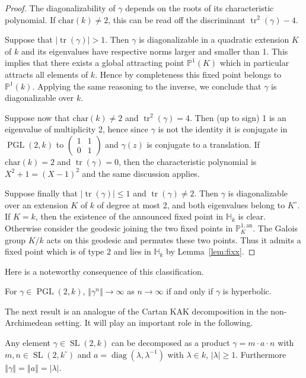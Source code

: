\documentclass[AHL,Unicode,longabstracts]{cedram}
\DeclareMathOperator{\tr}{tr}
\DeclareMathOperator{\SL}{SL}
\DeclareMathOperator{\PGL}{PGL}
\DeclareMathOperator{\diag}{diag}
\newcommand{\hh}{\mathbb{H}}
\newcommand{\an}{\mathrm{an}}
\newcommand{\cv}{\rightarrow}
\newcommand{\norm}[1]{\left\Vert#1\right\Vert}
\newcommand{\abs}[1]{\left\vert#1\right\vert}
\newcommand{\pu}{{\mathbb{P}^1}}
\newcommand{\PP}{\mathbb{P}}
\newcommand{\lrpar}[1]{\left(#1\right)}
\newcommand{\PGLk}{\PGL(2, k)}
\begin{document}
\begin{proof}
The diagonalizability of $\gamma$ depends on the roots of its characteristic polynomial.
If $\mathrm{char}(k)\neq 2$, this can be read off the discriminant $\tr^2(\gamma)-4$.

Suppose that $\mathopen|\tr(\gamma)\mathclose| >1$. Then $\gamma$ is diagonalizable in a quadratic extension $K$ of $k$ and its eigenvalues have respective norms larger and smaller than 1. This implies that there exists a global attracting point $\PP^1(K)$ which in particular attracts all elements of $k$. Hence by completeness this fixed point belongs to $\pu(k)$. Applying the same reasoning to the inverse, we conclude that $\gamma$ is diagonalizable over $k$.


Suppose now that $\mathrm{char}(k)\neq 2$ and $\tr^2(\gamma) =4$. Then (up to sign) 1 is an eigenvalue of multiplicity 2, hence since $\gamma$ is not the identity it is conjugate in $\PGLk$ to $\lrpar{
\begin{smallmatrix} 1& 1 \\ 0& 1
\end{smallmatrix}}$ and $\gamma(z)$ is conjugate to a translation.
If $\mathrm{char}(k)=2$ and $\tr(\gamma) = 0$, then the characteristic polynomial is $X^2+1 = (X-1)^2$ and the same discussion applies.

Suppose finally that $\mathopen|\tr(\gamma)\mathclose|\leq 1$ and $\tr(\gamma) \neq 2$. Then $\gamma$ is diagonalizable over an extension $K$ of $k$ of degree at most 2, and both eigenvalues belong to $K^\circ$. If $K=k$, then the existence of the announced fixed point in $\hh_k$ is clear. Otherwise consider the geodesic joining the two fixed points in $\PP^{1,\an}_K$. The Galois group $K/k$ acts on this geodesic and permutes these two points. Thus it admits a fixed point which is of type $2$ and lies in $\hh_k$ by Lemma~\ref{lem:fixx}.
\end{proof}

Here is a noteworthy consequence of this classification.

\begin{coro}
For $\gamma\in \PGLk$, $\norm{\gamma^n} \to \infty$ as $n\cv\infty$ if and only if $\gamma$ is hyperbolic.
\end{coro}

The next result is an analogue of the Cartan KAK decomposition in the non-Archimedean setting. It will play an important role in the following.

\begin{prop}\label{prop:KAK}
Any element $\gamma\in \SL(2,k)$ can be decomposed as a product $\gamma= m\cdot a \cdot n$ with $m,n \in \SL(2,k^\circ)$ and $a = \diag (\lambda, \lambda^{-1})$ with $\lambda\in k$, $|\lambda|\ge 1$. Furthermore $\norm{\gamma} = \norm{a} = \abs{\lambda}$.
\end{prop}
\end{document}

